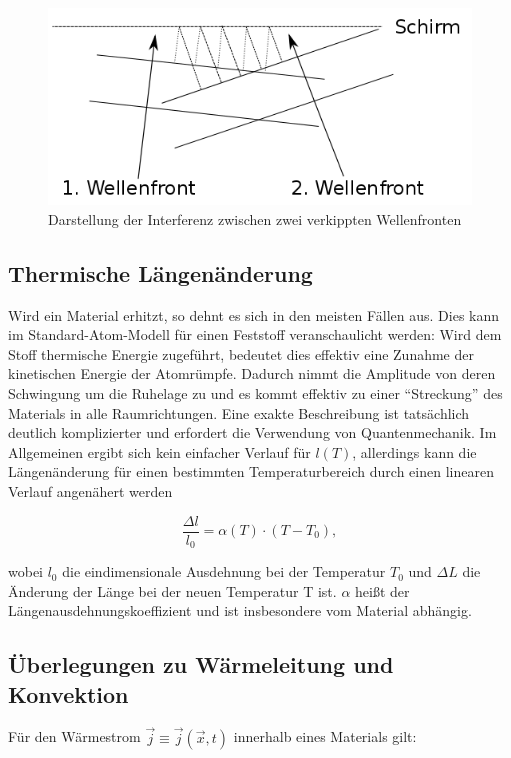 \begin{figure}
\centering
        \includegraphics[width=.9\textwidth]{images/verkippung.png}
\caption{Darstellung der Interferenz zwischen zwei verkippten Wellenfronten}
\label{verkippung}
\end{figure}


\subsection{Thermische Längenänderung}
Wird ein Material erhitzt, so dehnt es sich in den meisten Fällen aus. Dies kann im Standard-Atom-Modell für einen Feststoff veranschaulicht werden: Wird dem Stoff thermische Energie zugeführt, bedeutet dies effektiv eine Zunahme der kinetischen Energie der Atomrümpfe. Dadurch nimmt die Amplitude von deren Schwingung um die Ruhelage zu und es kommt effektiv zu einer \enquote{Streckung} des Materials in alle Raumrichtungen. Eine exakte Beschreibung ist tatsächlich deutlich komplizierter und erfordert die Verwendung von Quantenmechanik. Im Allgemeinen ergibt sich kein einfacher Verlauf für $ l(T) $, allerdings kann die Längenänderung für einen bestimmten Temperaturbereich durch einen linearen Verlauf angenähert werden 

\begin{equation}
\frac{ \Delta l}{l_{0}} = \alpha(T) \cdot (T-T_{0}), 
\label{formel:ausdehnung}
\end{equation}

wobei $ l_{0} $ die eindimensionale Ausdehnung bei der Temperatur $ T_{0} $ und $ \Delta L$ die Änderung der Länge bei der neuen Temperatur T ist. $ \alpha $ heißt der Längenausdehnungskoeffizient und ist insbesondere vom Material abhängig. 

\subsection{Überlegungen zu Wärmeleitung und Konvektion}
Für den Wärmestrom $ \vec{j} \equiv \vec{j}(\vec{x}, t) $ innerhalb eines Materials gilt: 

